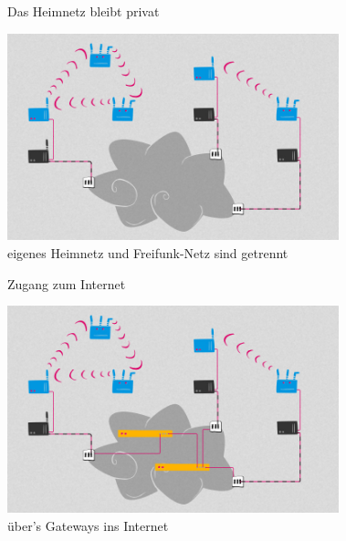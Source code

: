 \documentclass[10pt]{beamer}
\begin{document}
    \begin{frame}{Das Heimnetz bleibt privat}
      \begin{center}
        \includegraphics[height=6cm]{images/network_4}\\
        \vspace{1em}
        eigenes Heimnetz und Freifunk-Netz sind getrennt
        \vspace{1em}
      \end{center}
    \end{frame}

    \begin{frame}{Zugang zum Internet}
      \begin{center}
        \includegraphics[height=6cm]{images/network_5}\\
        \vspace{1em}
        über's Gateways ins Internet
        \vspace{1em}
      \end{center}
    \end{frame}
\end{document}
